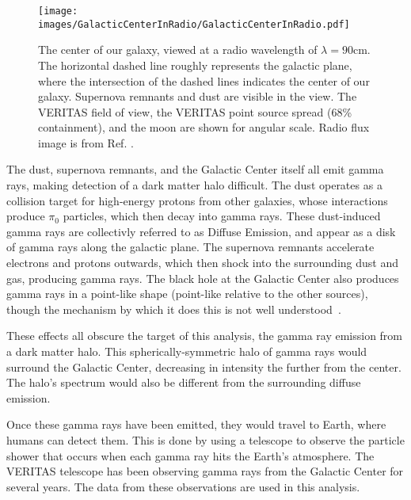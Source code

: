   \begin{figure}[ht]
    \centering
    \texttt{[image: images/GalacticCenterInRadio/GalacticCenterInRadio.pdf]}
    \caption[Galactic Center in Radio]{
      The center of our galaxy, viewed at a radio wavelength of $\lambda=90\text{cm}$.
      The horizontal dashed line roughly represents the galactic plane, where the intersection of the dashed lines indicates the center of our galaxy.
      Supernova remnants and dust are visible in the view.
      The VERITAS field of view, the VERITAS point source spread (68\% containment), and the moon are shown for angular scale.
      Radio flux image is from Ref. \cite{galactic_center_in_radio}.}
    \label{fig_gc_radio}
  \end{figure}

  The dust, supernova remnants, and the Galactic Center itself all emit gamma rays, making detection of a dark matter halo difficult.
  The dust operates as a collision target for high-energy protons from other galaxies, whose interactions produce $\pi_0$ particles, which then decay into gamma rays.
  These dust-induced gamma rays are collectivly referred to as Diffuse Emission, and appear as a disk of gamma rays along the galactic plane.
  The supernova remnants accelerate electrons and protons outwards, which then shock into the surrounding dust and gas, producing gamma rays.
  The black hole at the Galactic Center also produces gamma rays in a point-like shape (point-like relative to the other sources), though the mechanism by which it does this is not well understood~\cite{gal_cent_still_undetermined}.

  These effects all obscure the target of this analysis, the gamma ray emission from a dark matter halo.
  This spherically-symmetric halo of gamma rays would surround the Galactic Center, decreasing in intensity the further from the center.
  The halo's spectrum would also be different from the surrounding diffuse emission.

  Once these gamma rays have been emitted, they would travel to Earth, where humans can detect them.
  This is done by using a telescope to observe the particle shower that occurs when each gamma ray hits the Earth's atmosphere.
  The VERITAS telescope has been observing gamma rays from the Galactic Center for several years.
  The data from these observations are used in this analysis.


